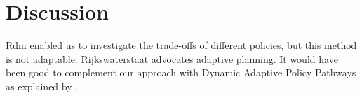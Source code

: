 \section{Discussion}
\label{s:discussion}




Rdm enabled us to investigate the trade-offs of different policies, but this method is not adaptable. Rijkswaterstaat advocates adaptive planning. It would have been good to complement our approach with Dynamic Adaptive Policy Pathways as explained by \cite{kwakkel_coping_2016}.
